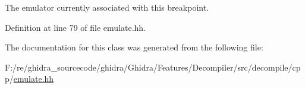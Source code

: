 The emulator currently associated with this breakpoint. 



Definition at line 79 of file emulate.\+hh.



The documentation for this class was generated from the following file\+:\begin{DoxyCompactItemize}
\item 
F\+:/re/ghidra\+\_\+sourcecode/ghidra/\+Ghidra/\+Features/\+Decompiler/src/decompile/cpp/\mbox{\hyperlink{emulate_8hh}{emulate.\+hh}}\end{DoxyCompactItemize}
